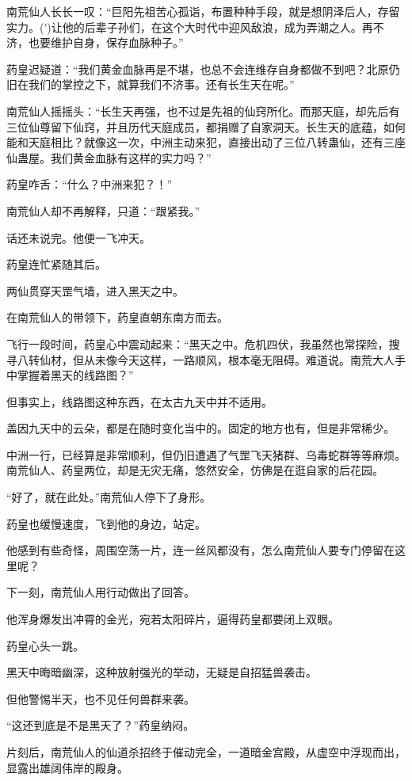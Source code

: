 \begin{this_body}
南荒仙人长长一叹：“巨阳先祖苦心孤诣，布置种种手段，就是想阴泽后人，存留实力。(’)让他的后辈子孙们，在这个大时代中迎风敌浪，成为弄潮之人。再不济，也要维护自身，保存血脉种子。”

药皇迟疑道：“我们黄金血脉再是不堪，也总不会连维存自身都做不到吧？北原仍旧在我们的掌控之下，就算我们不济事。还有长生天在呢。”

南荒仙人摇摇头：“长生天再强，也不过是先祖的仙窍所化。而那天庭，却先后有三位仙尊留下仙窍，并且历代天庭成员，都捐赠了自家洞天。长生天的底蕴，如何能和天庭相比？就像这一次，中洲主动来犯，直接出动了三位八转蛊仙，还有三座仙蛊屋。我们黄金血脉有这样的实力吗？”

药皇咋舌：“什么？中洲来犯？！”

南荒仙人却不再解释，只道：“跟紧我。”

话还未说完。他便一飞冲天。

药皇连忙紧随其后。

两仙贯穿天罡气墙，进入黑天之中。

在南荒仙人的带领下，药皇直朝东南方而去。

飞行一段时间，药皇心中震动起来：“黑天之中。危机四伏，我虽然也常探险，搜寻八转仙材，但从未像今天这样，一路顺风，根本毫无阻碍。难道说。南荒大人手中掌握着黑天的线路图？”

但事实上，线路图这种东西，在太古九天中并不适用。

盖因九天中的云朵，都是在随时变化当中的。固定的地方也有，但是非常稀少。

中洲一行，已经算是非常顺利，但仍旧遭遇了气罡飞天猪群、乌毒蛇群等等麻烦。南荒仙人、药皇两位，却是无灾无痛，悠然安全，仿佛是在逛自家的后花园。

“好了，就在此处。”南荒仙人停下了身形。

药皇也缓慢速度，飞到他的身边，站定。

他感到有些奇怪，周围空荡一片，连一丝风都没有，怎么南荒仙人要专门停留在这里呢？

下一刻，南荒仙人用行动做出了回答。

他浑身爆发出冲霄的金光，宛若太阳碎片，逼得药皇都要闭上双眼。

药皇心头一跳。

黑天中晦暗幽深，这种放射强光的举动，无疑是自招猛兽袭击。

但他警惕半天，也不见任何兽群来袭。

“这还到底是不是黑天了？”药皇纳闷。

片刻后，南荒仙人的仙道杀招终于催动完全，一道暗金宫殿，从虚空中浮现而出，显露出雄阔伟岸的殿身。


\end{this_body}
